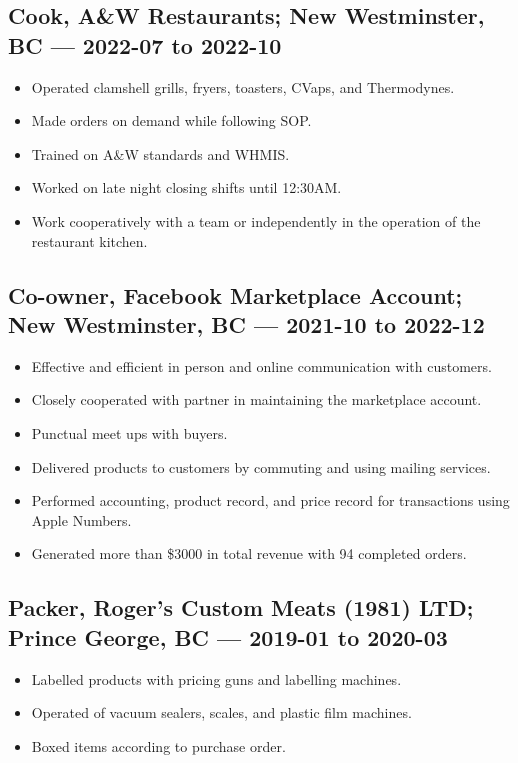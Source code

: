 \documentclass{article}
\begin{document}
\subsection*{Cook, A\&W Restaurants; New Westminster, BC — 2022-07 to 2022-10}

\begin{itemize}
\item Operated clamshell grills, fryers, toasters, CVaps, and Thermodynes.
\item Made orders on demand while following SOP.
\item Trained on A\&W standards and WHMIS.
\item Worked on late night closing shifts until 12:30AM.
\item Work cooperatively with a team or independently in the operation of the restaurant kitchen.
\end{itemize}

\subsection*{Co-owner, Facebook Marketplace Account; New Westminster, BC — 2021-10 to 2022-12}

\begin{itemize}
\item Effective and efficient in person and online communication with customers.
\item Closely cooperated with partner in maintaining the marketplace account.
\item Punctual meet ups with buyers.
\item Delivered products to customers by commuting and using mailing services.
\item Performed accounting, product record, and price record for transactions using Apple Numbers.
\item Generated more than \$3000 in total revenue with 94 completed orders.
\end{itemize}

\subsection*{Packer, Roger's Custom Meats (1981) LTD; Prince George, BC — 2019-01 to 2020-03}

\begin{itemize}
\item Labelled products with pricing guns and labelling machines.
\item Operated of vacuum sealers, scales, and plastic film machines.
\item Boxed items according to purchase order.
\end{itemize}
\end{document}
